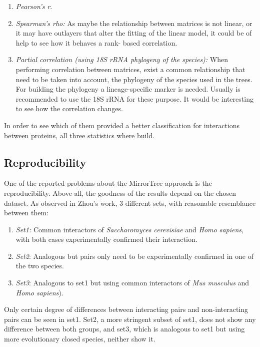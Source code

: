 \documentclass[11pt]{article}
\begin{document}
\begin{enumerate}
\setlength{\itemsep}{1pt}
	\item \textit{Pearson's r}\cite{Pazos2001}.
	\item \textit{Spearman's rho:} As maybe the relationship between matrices is not linear, or it may have 		outlayers that alter the fitting of the linear model, it could be of help to see how it behaves a rank-		based correlation.
	\item \textit{Partial correlation (using 18S rRNA phylogeny of the species):}\cite{Sato2005} When 			performing correlation between matrices, exist a common relationship that need to be taken into account, 		the phylogeny of the species used in the trees. For building the phylogeny a lineage-specific marker is 		needed. Usually is recommended to use the 18S rRNA for these purpose\cite{Sato2005}. It would be 				interesting to see how the correlation changes.
\end{enumerate}

In order to see which of them provided a better classification for interactions between proteins, all three statistics where build.

\subsection{Reproducibility}
One of the reported problems about the MirrorTree approach is the reproducibility. Above all, the goodness of the results depend on the chosen dataset. As observed in Zhou's work\cite{Zhou13}, 3 different sets, with reasonable resemblance between them:
\begin{enumerate}
\setlength{\itemsep}{1pt}
	\item \textit{Set1:} Common interactors of \textit{Saccharomyces cerevisiae} and \textit{Homo sapiens}, 		with both cases experimentally confirmed their interaction.
	\item \textit{Set2}: Analogous but pairs only need to be experimentally confirmed in one of the two 			species.
	\item \textit{Set3}: Analogous to set1 but using common interactors of \textit{Mus musculus} and   \textit{Homo sapiens}).
\end{enumerate}
Only certain degree of differences between interacting pairs and non-interacting pairs can be seen in set1. Set2, a more stringent subset of set1, does not show any difference between both groups, and set3, which is analogous to set1 but using more evolutionary closed species, neither show it.
\end{document}
